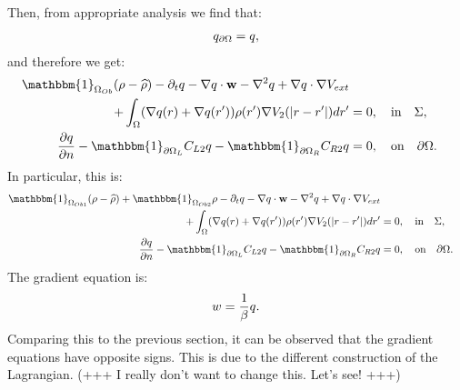 Then, from appropriate analysis we find that:
\begin{align*}
{q}_{\partial \Omega} = q,
\end{align*}
and therefore we get:
\begin{align*}
\mathbbm{1}_{\Omega_{Ob}}(\rho- \widehat{\rho})   - \partial_t  \Adjb  - \nabla \Adjb \cdot \mathbf{w}  - \nabla^2 \Adjb \notag 
+  \nabla \Adjb \cdot \nabla V_{ext}  \notag \\
+ \int_\Omega (\nabla  \Adjb(r)+\nabla  \Adjb(r')) \rho(r') \nabla V_2(|r-r'|) dr' &=0, \quad \text{in} \quad \Sigma, \\
\frac{\partial \Adjb }{\partial n}  -\mathbbm{1}_{\partial \Omega_L} C_{L2} \Adjb   -\mathbbm{1}_{\partial \Omega_R} C_{R2} \Adjb&=0, \quad \text{on} \quad \partial \Omega.
\end{align*}
In particular, this is:
\begin{align*}
\mathbbm{1}_{\Omega_{Ob1}}(\rho- \widehat{\rho}) +\mathbbm{1}_{\Omega_{Ob2}}\rho  - \partial_t  \Adjb  - \nabla \Adjb \cdot \mathbf{w}  - \nabla^2 \Adjb \notag 
+  \nabla \Adjb \cdot \nabla V_{ext}  \notag \\
+ \int_\Omega (\nabla  \Adjb(r)+\nabla  \Adjb(r')) \rho(r') \nabla V_2(|r-r'|) dr' &=0, \quad \text{in} \quad \Sigma, \\
\frac{\partial \Adjb }{\partial n}  -\mathbbm{1}_{\partial \Omega_L} C_{L2} \Adjb   -\mathbbm{1}_{\partial \Omega_R} C_{R2} \Adjb&=0, \quad \text{on} \quad \partial \Omega.
\end{align*}
The gradient equation is:
\begin{align*}
w = \frac{1}{\beta}q.
\end{align*}
Comparing this to the previous section, it can be observed that the gradient equations have opposite signs. This is due to the different construction of the Lagrangian. (+++ I really don't want to change this. Let's see! +++)


